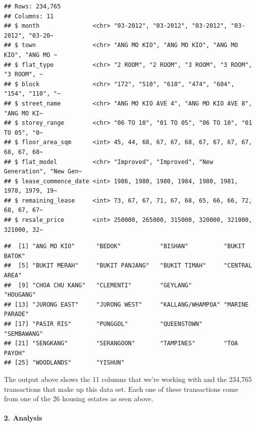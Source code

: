 \documentclass[
]{article}
\newenvironment{Shaded}{\begin{snugshade}}{\end{snugshade}}
\newcommand{\FunctionTok}[1]{\textcolor[rgb]{0.00,0.00,0.00}{#1}}
\newcommand{\NormalTok}[1]{#1}
\newcommand{\SpecialCharTok}[1]{\textcolor[rgb]{0.00,0.00,0.00}{#1}}
\begin{document}
\begin{verbatim}
## Rows: 234,765
## Columns: 11
## $ month               <chr> "03-2012", "03-2012", "03-2012", "03-2012", "03-20~
## $ town                <chr> "ANG MO KIO", "ANG MO KIO", "ANG MO KIO", "ANG MO ~
## $ flat_type           <chr> "2 ROOM", "2 ROOM", "3 ROOM", "3 ROOM", "3 ROOM", ~
## $ block               <chr> "172", "510", "610", "474", "604", "154", "110", "~
## $ street_name         <chr> "ANG MO KIO AVE 4", "ANG MO KIO AVE 8", "ANG MO KI~
## $ storey_range        <chr> "06 TO 10", "01 TO 05", "06 TO 10", "01 TO 05", "0~
## $ floor_area_sqm      <int> 45, 44, 68, 67, 67, 68, 67, 67, 67, 67, 68, 67, 68~
## $ flat_model          <chr> "Improved", "Improved", "New Generation", "New Gen~
## $ lease_commence_date <int> 1986, 1980, 1980, 1984, 1980, 1981, 1978, 1979, 19~
## $ remaining_lease     <int> 73, 67, 67, 71, 67, 68, 65, 66, 66, 72, 68, 67, 67~
## $ resale_price        <int> 250000, 265000, 315000, 320000, 321000, 321000, 32~
\end{verbatim}

\begin{Shaded}
\end{Shaded}

\begin{verbatim}
##  [1] "ANG MO KIO"      "BEDOK"           "BISHAN"          "BUKIT BATOK"    
##  [5] "BUKIT MERAH"     "BUKIT PANJANG"   "BUKIT TIMAH"     "CENTRAL AREA"   
##  [9] "CHOA CHU KANG"   "CLEMENTI"        "GEYLANG"         "HOUGANG"        
## [13] "JURONG EAST"     "JURONG WEST"     "KALLANG/WHAMPOA" "MARINE PARADE"  
## [17] "PASIR RIS"       "PUNGGOL"         "QUEENSTOWN"      "SEMBAWANG"      
## [21] "SENGKANG"        "SERANGOON"       "TAMPINES"        "TOA PAYOH"      
## [25] "WOODLANDS"       "YISHUN"
\end{verbatim}

The output above shows the 11 columns that we're working with and the
234,765 transactions that make up this data set. Each one of these
transactions come from one of the 26 housing estates as seen above.

\hypertarget{analysis}{%
\paragraph{2. Analysis}\label{analysis}}
\end{document}
